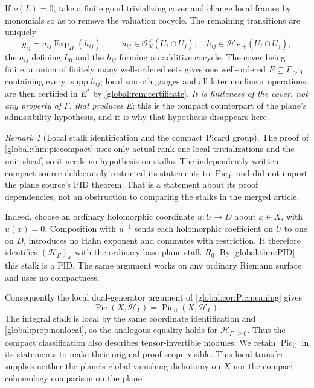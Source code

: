 \documentclass[11pt,letterpaper]{article}
\theoremstyle{definition}
\theoremstyle{remark}
\newtheorem{remark}[remark]{Remark}
\newcommand{\OO}{\mathcal O}
\newcommand{\HH}{\mathscr H_\Gamma}
\newcommand{\HP}{\mathscr H_{\Gamma,+}}
\newcommand{\HI}{\mathscr H_{\Gamma,\ge0}}
\newcommand{\supp}{\operatorname{supp}}
\newcommand{\Pic}{\operatorname{Pic}}
\newcommand{\Piclf}{\operatorname{Pic}_{\mathrm{lf}}}
\newcommand{\ExpH}{\operatorname{Exp}_{H}}
\numberwithin{equation}{section}
\begin{document}
If $\nu(L)=0$, take a finite good trivializing cover and change local frames by monomials so as to remove the valuation cocycle. The remaining transitions are uniquely
\begin{equation}\label{global:eq:normalcocycle}
  g_{ij}=a_{ij}\ExpH(h_{ij}),\qquad
  a_{ij}\in\OO_X^\times(U_i\cap U_j),\quad h_{ij}\in\HP(U_i\cap U_j),
\end{equation}
the $a_{ij}$ defining $L_0$ and the $h_{ij}$ forming an additive cocycle. The cover being finite, a union of finitely many well-ordered sets gives one well-ordered $E\subseteq\Gamma_{>0}$ containing every $\supp h_{ij}$; local smooth gauges and all later nonlinear operations are then certified in $E^*$ by \cref{global:rem:certificate}. \emph{It is finiteness of the cover, not any property of $\Gamma$, that produces $E$}; this is the compact counterpart of the plane's admissibility hypothesis, and it is why that hypothesis disappears here.

\begin{remark}[Local stalk identification and the compact Picard group]\label{global:rem:piclfcompact}
The proof of \cref{global:thm:piccompact} uses only actual rank-one local
trivializations and the unit sheaf, so it needs no hypothesis on stalks.
The independently written compact source deliberately restricted its statements
to $\Piclf$ and did not import the plane source's PID theorem. That is a
statement about its proof dependencies, not an obstruction to comparing the
stalks in the merged article.

Indeed, choose an ordinary holomorphic coordinate $u:U\to D$ about $x\in X$,
with $u(x)=0$. Composition with $u^{-1}$ sends each holomorphic coefficient on
$U$ to one on $D$, introduces no Hahn exponent and commutes with restriction.
It therefore identifies $(\HH)_x$ with the ordinary-base plane stalk $R_0$.
By \cref{global:thm:PID} this stalk is a PID. The same argument works on
any ordinary Riemann surface and uses no compactness.

Consequently the local dual-generator argument of
\cref{global:cor:Picmeaning} gives
\[
  \Pic(X,\HH)=\Piclf(X,\HH).
\]
The integral stalk is local by the same coordinate identification and
\cref{global:prop:nonlocal}, so the analogous equality holds for $\HI$.
Thus the compact classification also describes tensor-invertible modules.
We retain $\Piclf$ in its statements to make their original proof scope
visible. This local transfer supplies neither the plane's global vanishing
dichotomy on $X$ nor the compact cohomology comparison on the plane.
\end{remark}
\end{document}
